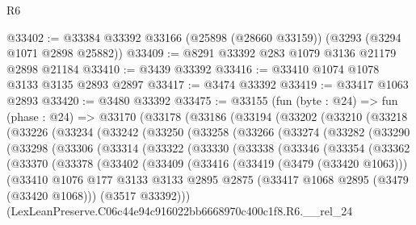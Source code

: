 \begin{lexlean}{R6}
\begin{coremodule}
@33402 := @33384 @33392 @33166 (@25898 (@28660 @33159)) (@3293 (@3294 @1071 @2898 @25882))
@33409 := @8291 @33392 @283 @1079 @3136 @21179 @2898 @21184
@33410 := @3439 @33392
@33416 := @33410 @1074 @1078 @3133 @3135 @2893 @2897
@33417 := @3474 @33392
@33419 := @33417 @1063 @2893
@33420 := @3480 @33392
@33475 := @33155
    (fun (byte : @24) =>
    fun (phase : @24) =>
    @33170
      (@33178
        (@33186
          (@33194
            (@33202
              (@33210
                (@33218
                  (@33226
                    (@33234
                      (@33242
                        (@33250
                          (@33258
                            (@33266
                              (@33274
                                (@33282
                                  (@33290
                                    (@33298
                                      (@33306
                                        (@33314
                                          (@33322
                                            (@33330
                                              (@33338
                                                (@33346
                                                  (@33354
                                                    (@33362
                                                      (@33370
                                                        (@33378
                                                          (@33402
                                                            (@33409
                                                              (@33416
                                                                (@33419 (@3479 (@33420 @1063)))
                                                                (@33410
                                                                  @1076
                                                                  @177
                                                                  @3133
                                                                  @3133
                                                                  @2895
                                                                  @2875
                                                                  (@33417
                                                                    @1068
                                                                    @2895
                                                                    (@3479 (@33420 @1068)))
                                                                  (@3517 @33392)))
                                                              (LexLeanPreserve.C06c44e94c916022bb6668970c400c1f8.R6.__rel_24

\end{coremodule}
\end{lexlean}

